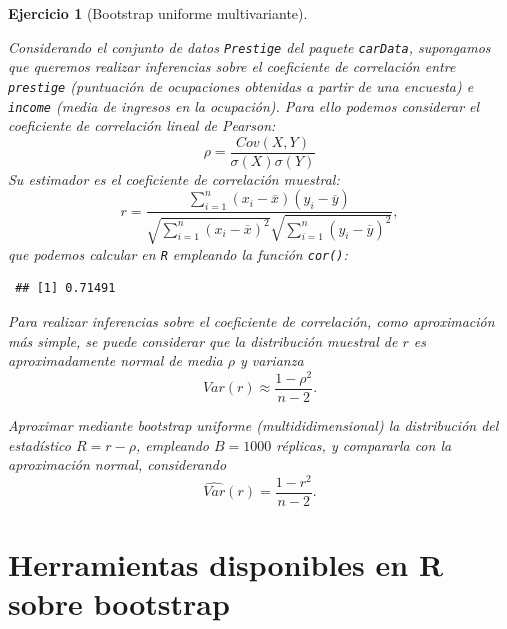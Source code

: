 \documentclass[
  spanish,
  10pt,
]{book}
\newenvironment{Shaded}{\begin{snugshade}}{\end{snugshade}}
\newcommand{\AttributeTok}[1]{\textcolor[rgb]{0.13,0.29,0.53}{#1}}
\newcommand{\CommentTok}[1]{\textcolor[rgb]{0.56,0.35,0.01}{\textit{#1}}}
\newcommand{\FunctionTok}[1]{\textcolor[rgb]{0.13,0.29,0.53}{\textbf{#1}}}
\newcommand{\NormalTok}[1]{#1}
\newcommand{\SpecialCharTok}[1]{\textcolor[rgb]{0.81,0.36,0.00}{\textbf{#1}}}
\newcommand{\StringTok}[1]{\textcolor[rgb]{0.31,0.60,0.02}{#1}}
\theoremstyle{break}
\newtheorem{exercise}{Ejercicio}[chapter]
\theoremstyle{nonumberplain}
\renewcommand{\CommentTok}[1]{\textcolor[rgb]{0.41,0.41,0.41}{\texttt{#1}}}
\begin{document}
\begin{exercise}[Bootstrap uniforme multivariante]
\protect\hypertarget{exr:unif-multi}{}\label{exr:unif-multi}

Considerando el conjunto de datos \texttt{Prestige} del paquete \texttt{carData}, supongamos que queremos realizar inferencias sobre el coeficiente de correlación entre \texttt{prestige} (puntuación de ocupaciones obtenidas a partir de una encuesta) e \texttt{income} (media de ingresos en la ocupación).
Para ello podemos considerar el coeficiente de correlación lineal de Pearson:
\[\rho =\frac{ Cov \left( X, Y \right) }
{ \sigma \left( X \right) \sigma \left( Y \right) }\]
Su estimador es el coeficiente de correlación muestral:
\[r=\frac{\sum_{i=1}^{n}(x_i-\overline{x})(y_i-\overline{y})}
{\sqrt{ \sum_{i=1}^{n}(x_i-\overline{x})^{2}} 
\sqrt{\sum_{i=1}^{n}(y_i-\overline{y})^{2}}},\]
que podemos calcular en \texttt{R} empleando la función \texttt{cor()}:

\begin{Shaded}
\end{Shaded}

\begin{verbatim}
 ## [1] 0.71491
\end{verbatim}

Para realizar inferencias sobre el coeficiente de correlación, como aproximación más simple, se puede considerar que la distribución muestral de \(r\) es aproximadamente normal de media \(\rho\) y varianza
\[Var(r) \approx \frac{1 - \rho^2}{n - 2}.\]

Aproximar mediante bootstrap uniforme (multididimensional) la distribución del estadístico \(R = r -\rho\), empleando \(B=1000\) réplicas, y compararla con la aproximación normal, considerando
\[\widehat{Var}(r) = \frac{1 - r^2}{n - 2}.\]
\end{exercise}

\section{Herramientas disponibles en R sobre bootstrap}\label{intro-paquetes}
\end{document}
